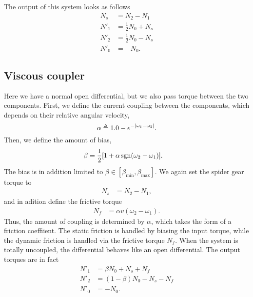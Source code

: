 \documentclass[a4paper]{report}
\begin{document}
The output of this system looks as follows
\begin{align}
  N_s &= N_2 - N_1\\
  N'_1 &= \frac{1}{2} N_0 + N_s\\
  N'_2 &= \frac{1}{2} N_0 - N_s\\
  N'_0 &= - N_0.
\end{align}
			
\subsection{Viscous coupler}

Here we have a normal open differential, but we also pass torque
between the two components.  First, we define the current coupling
between the components, which depends on their relative angular velocity,
\begin{equation}
  \alpha \mathrel{\triangleq} 1.0 - e^{-|\omega_1 - \omega_2|}.
\end{equation}
Then, we define the amount of bias, 
\begin{align}
  \beta &= \frac{1}{2}[1 + \alpha\mathop{\rm sgn}(\omega_2 - \omega_1)].
\end{align}
The bias is in addition limited to $\beta \in [\beta_{\min},
\beta_{\max}]$. We again set the spider gear torque to
\begin{align}
  N_s &= N_2 - N_1,
\end{align}
and in adition define the frictive torque
\begin{align}
  N_f &= \alpha v (\omega_2 - \omega_1).
\end{align}
Thus, the amount of coupling is determined by $\alpha$, which takes
the form of a friction coeffiient. The static friction is handled by
biasing the input torque, while the dynamic friction is handled via
the frictive torque $N_f$. When the system is totally uncoupled, the
differential behaves like an open differential.
The output torques are in fact
\begin{align}
  N'_1 &= \beta N_0 + N_s + N_f\\
  N'_2 &= (1 - \beta) N_0 - N_s - N_f\\
  N'_0 &= - N_0.
\end{align}
\end{document}
